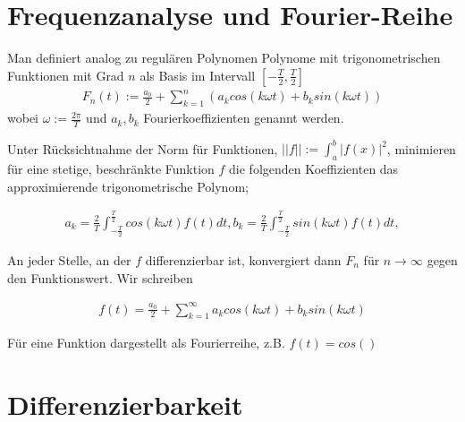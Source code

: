 \pagebreak

\section{Frequenzanalyse und Fourier-Reihe}
\begin{definition}
	Man definiert analog zu regulären Polynomen Polynome mit trigonometrischen Funktionen mit Grad $n$ als Basis im Intervall $[-\frac{T}{2}, \frac{T}{2}]$ 
	\begin{align*}
		F_n(t) := \frac{a_0}{2} + \sum_{k=1}^{n} (a_k cos(k\omega t) + b_k sin(k \omega t))
	\end{align*}
	wobei $\omega := \frac{2 \pi}{T}$ und $a_k, b_k$ Fourierkoeffizienten genannt werden.
\end{definition}

\begin{satz}
	Unter Rücksichtnahme der Norm für Funktionen, $||f|| := \int_a^b |f(x)|^2$, minimieren für eine stetige, beschränkte Funktion $f$ die folgenden Koeffizienten das approximierende trigonometrische Polynom;
	
	\begin{align*}
		a_k = \frac{2}{T} \int_{-\frac{T}{2}}^{\frac{T}{2}} cos(k \omega t)f(t) dt,
		b_k = \frac{2}{T} \int_{-\frac{T}{2}}^{\frac{T}{2}} sin(k \omega t)f(t) dt,	
	\end{align*}
	
	An jeder Stelle, an der $f$ differenzierbar ist, konvergiert dann $F_n$ für $n \rightarrow \infty$ gegen den Funktionswert. Wir schreiben
	
	\begin{align*}
		f(t) = \frac{a_0}{2} + \sum_{k=1}^{\infty}a_k cos(k \omega t) + b_k sin(k \omega t)
	\end{align*}
\end{satz}

\begin{definition}[Spektrum]
	Für eine Funktion dargestellt als Fourierreihe, z.B. $f(t) = cos()$
\end{definition}

\pagebreak

\section{Differenzierbarkeit}

